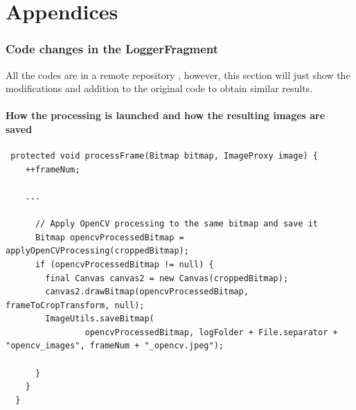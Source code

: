 \documentclass[12pt]{report}
\begin{document}
\chapter*{Appendices}
\label{sub:Appendices}
\subsection*{Code changes in the LoggerFragment}

All the codes are in a remote repository \cite{bib:repo}, however, this section will just show the modifications and addition to the original code to obtain similar results.

\subsubsection{How the processing is launched and how the resulting images are saved}
\label{sub:log}
\begin{lstlisting}
 protected void processFrame(Bitmap bitmap, ImageProxy image) {
    ++frameNum;

    ...
 
      // Apply OpenCV processing to the same bitmap and save it
      Bitmap opencvProcessedBitmap = applyOpenCVProcessing(croppedBitmap);
      if (opencvProcessedBitmap != null) {
        final Canvas canvas2 = new Canvas(croppedBitmap);
        canvas2.drawBitmap(opencvProcessedBitmap, frameToCropTransform, null);
        ImageUtils.saveBitmap(
                opencvProcessedBitmap, logFolder + File.separator + "opencv_images", frameNum + "_opencv.jpeg");

      }
    }
  }
\end{lstlisting}
\end{document}
